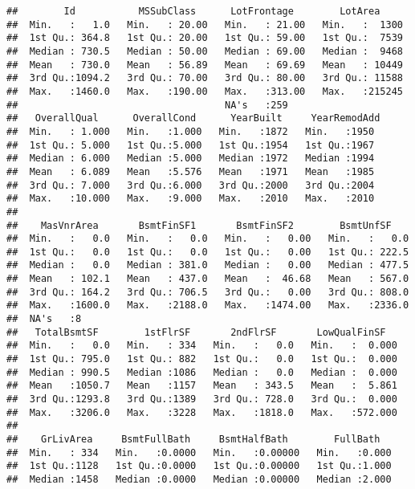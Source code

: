 \documentclass[]{article}
\begin{document}
\begin{verbatim}
##        Id           MSSubClass      LotFrontage        LotArea      
##  Min.   :   1.0   Min.   : 20.00   Min.   : 21.00   Min.   :  1300  
##  1st Qu.: 364.8   1st Qu.: 20.00   1st Qu.: 59.00   1st Qu.:  7539  
##  Median : 730.5   Median : 50.00   Median : 69.00   Median :  9468  
##  Mean   : 730.0   Mean   : 56.89   Mean   : 69.69   Mean   : 10449  
##  3rd Qu.:1094.2   3rd Qu.: 70.00   3rd Qu.: 80.00   3rd Qu.: 11588  
##  Max.   :1460.0   Max.   :190.00   Max.   :313.00   Max.   :215245  
##                                    NA's   :259                      
##   OverallQual      OverallCond      YearBuilt     YearRemodAdd 
##  Min.   : 1.000   Min.   :1.000   Min.   :1872   Min.   :1950  
##  1st Qu.: 5.000   1st Qu.:5.000   1st Qu.:1954   1st Qu.:1967  
##  Median : 6.000   Median :5.000   Median :1972   Median :1994  
##  Mean   : 6.089   Mean   :5.576   Mean   :1971   Mean   :1985  
##  3rd Qu.: 7.000   3rd Qu.:6.000   3rd Qu.:2000   3rd Qu.:2004  
##  Max.   :10.000   Max.   :9.000   Max.   :2010   Max.   :2010  
##                                                                
##    MasVnrArea       BsmtFinSF1       BsmtFinSF2        BsmtUnfSF     
##  Min.   :   0.0   Min.   :   0.0   Min.   :   0.00   Min.   :   0.0  
##  1st Qu.:   0.0   1st Qu.:   0.0   1st Qu.:   0.00   1st Qu.: 222.5  
##  Median :   0.0   Median : 381.0   Median :   0.00   Median : 477.5  
##  Mean   : 102.1   Mean   : 437.0   Mean   :  46.68   Mean   : 567.0  
##  3rd Qu.: 164.2   3rd Qu.: 706.5   3rd Qu.:   0.00   3rd Qu.: 808.0  
##  Max.   :1600.0   Max.   :2188.0   Max.   :1474.00   Max.   :2336.0  
##  NA's   :8                                                           
##   TotalBsmtSF        1stFlrSF       2ndFlrSF       LowQualFinSF    
##  Min.   :   0.0   Min.   : 334   Min.   :   0.0   Min.   :  0.000  
##  1st Qu.: 795.0   1st Qu.: 882   1st Qu.:   0.0   1st Qu.:  0.000  
##  Median : 990.5   Median :1086   Median :   0.0   Median :  0.000  
##  Mean   :1050.7   Mean   :1157   Mean   : 343.5   Mean   :  5.861  
##  3rd Qu.:1293.8   3rd Qu.:1389   3rd Qu.: 728.0   3rd Qu.:  0.000  
##  Max.   :3206.0   Max.   :3228   Max.   :1818.0   Max.   :572.000  
##                                                                    
##    GrLivArea     BsmtFullBath     BsmtHalfBath        FullBath    
##  Min.   : 334   Min.   :0.0000   Min.   :0.00000   Min.   :0.000  
##  1st Qu.:1128   1st Qu.:0.0000   1st Qu.:0.00000   1st Qu.:1.000  
##  Median :1458   Median :0.0000   Median :0.00000   Median :2.000  

\end{verbatim}
\end{document}
